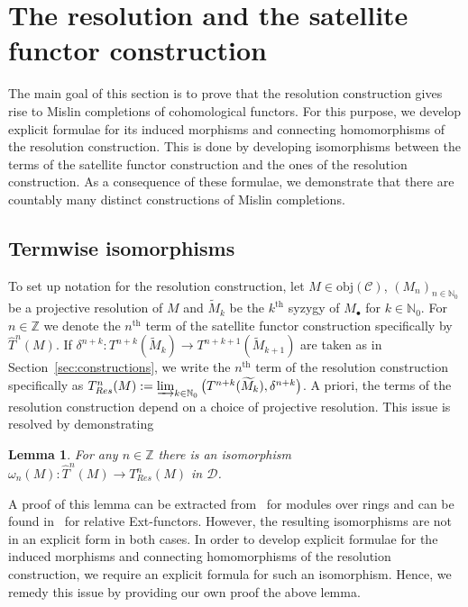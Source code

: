 \documentclass[12pt,a4paper]{article}
\numberwithin{equation}{section}
\newtheorem{lem}[thm]{Lemma}
\theoremstyle{nonumberplain}
\begin{document}
\section{The resolution and the satellite functor construction}\label{sec:resols}

The main goal of this section is to prove that the resolution construction gives rise to Mislin completions of cohomological functors. For this purpose, we develop explicit formulae for its induced morphisms and connecting homomorphisms of the resolution construction. This is done by developing isomorphisms between the terms of the satellite functor construction and the ones of the resolution construction. As a consequence of these formulae, we demonstrate that there are countably many distinct constructions of Mislin  completions.

\subsection{Termwise isomorphisms}

To set up notation for the resolution construction, let $M \in \mathrm{obj}(\mathcal{C})$, $(M_n)_{n \in \mathbb{N}_0}$ be a projective resolution of $M$ and $\widetilde{M}_k$ be the $k^{\text{th}}$ syzygy of $M_{\bullet}$ for $k \in \mathbb{N}_0$. For $n \in \mathbb{Z}$ we denote the $n^{\text{th}}$ term of the satellite functor construction specifically by $\widehat{T}^n(M)$. If $\delta^{n+k}: T^{n+k}(\widetilde{M}_k) \rightarrow T^{n+k+1}(\widetilde{M}_{k+1})$ are taken as in Section~\ref{sec:constructions}, we write the $n^{\text{th}}$ term of the resolution construction specifically as $T_{Res}^n(M) := \varinjlim_{k \in \mathbb{N}_0} \big(T^{n+k}(\widetilde{M}_k), \delta^{n+k}\big)$. A priori, the terms of the resolution construction depend on a choice of projective resolution. This issue is resolved by demonstrating

\begin{lem}\label{lem:resolisoms}
For any $n \in \mathbb{Z}$ there is an isomorphism $\omega_n(M): \widehat{T}^n(M) \rightarrow T_{Res}^n(M)$ in $\mathcal{D}$.
\end{lem}

A proof of this lemma can be extracted from~\cite[p.~299]{mis94} for modules over rings and can be found in~\cite[p.~20]{guo23} for relative Ext-functors. However, the resulting isomorphisms are not in an explicit form in both cases. In order to develop explicit formulae for the induced morphisms and connecting homomorphisms of the resolution construction, we require an explicit formula for such an isomorphism. Hence, we remedy this issue by providing our own proof the above lemma.
\end{document}
